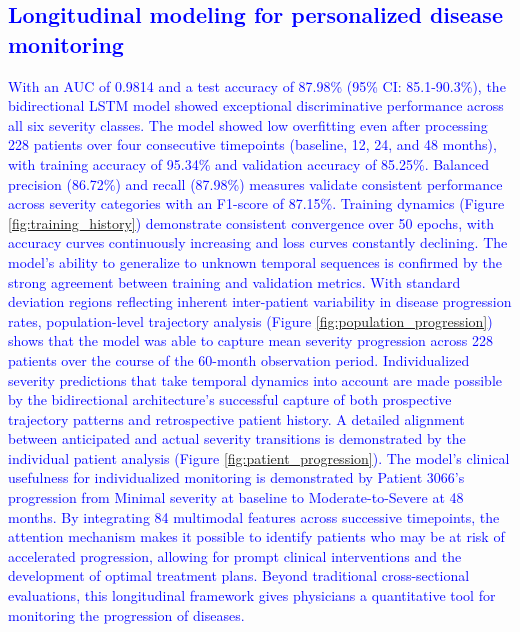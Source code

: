 \documentclass[twocolumn]{article}
\begin{document}
\textcolor{blue}{
\subsection{Longitudinal modeling for personalized disease monitoring}
With an AUC of 0.9814 and a test accuracy of 87.98\% (95\% CI: 85.1-90.3\%), the bidirectional LSTM model showed exceptional discriminative performance across all six severity classes.   The model showed low overfitting even after processing 228 patients over four consecutive timepoints (baseline, 12, 24, and 48 months), with training accuracy of 95.34\% and validation accuracy of 85.25\%.   Balanced precision (86.72\%) and recall (87.98\%) measures validate consistent performance across severity categories with an F1-score of 87.15\%. Training dynamics (Figure \ref{fig:training_history}) demonstrate consistent convergence over 50 epochs, with accuracy curves continuously increasing and loss curves constantly declining.  The model's ability to generalize to unknown temporal sequences is confirmed by the strong agreement between training and validation metrics.  With standard deviation regions reflecting inherent inter-patient variability in disease progression rates, population-level trajectory analysis (Figure \ref{fig:population_progression}) shows that the model was able to capture mean severity progression across 228 patients over the course of the 60-month observation period.  Individualized severity predictions that take temporal dynamics into account are made possible by the bidirectional architecture's successful capture of both prospective trajectory patterns and retrospective patient history. A detailed alignment between anticipated and actual severity transitions is demonstrated by the individual patient analysis (Figure \ref{fig:patient_progression}).  The model's clinical usefulness for individualized monitoring is demonstrated by Patient 3066's progression from Minimal severity at baseline to Moderate-to-Severe at 48 months.  By integrating 84 multimodal features across successive timepoints, the attention mechanism makes it possible to identify patients who may be at risk of accelerated progression, allowing for prompt clinical interventions and the development of optimal treatment plans.  Beyond traditional cross-sectional evaluations, this longitudinal framework gives physicians a quantitative tool for monitoring the progression of diseases.
}
\end{document}
